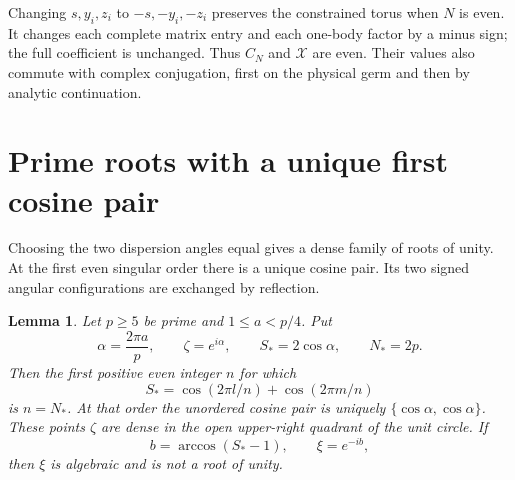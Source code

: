 \documentclass[11pt]{article}
\numberwithin{equation}{section}
\newtheorem{lemma}[theorem]{Lemma}
\theoremstyle{remark}\newtheorem{remark}[theorem]{Remark}
\newcommand{\X}{\mathcal X}
\begin{document}
Changing $s,y_i,z_i$ to $-s,-y_i,-z_i$ preserves the constrained
torus when $N$ is even. It changes each complete matrix entry and
each one-body factor by a minus sign; the full coefficient is
unchanged. Thus $C_N$ and $\X$ are even. Their values also commute
with complex conjugation, first on the physical germ and then by
analytic continuation.

\section{Prime roots with a unique first cosine pair}
\label{sec:prime-roots}

Choosing the two dispersion angles equal gives a dense family of roots
of unity. At the first even singular order there is a unique cosine
pair. Its two signed angular configurations are exchanged by reflection.

\begin{lemma}\label{lem:prime-root-family}
Let $p\geq5$ be prime and $1\leq a<p/4$. Put
\[
 \alpha=\frac{2\pi a}{p},\qquad
 \zeta=e^{i\alpha},\qquad S_*=2\cos\alpha,
 \qquad N_*=2p.
\]
Then the first positive even integer $n$ for which
\[
 S_*=\cos(2\pi l/n)+\cos(2\pi m/n)
\]
is $n=N_*$. At that order the unordered cosine pair is uniquely
$\{\cos\alpha,\cos\alpha\}$. These points $\zeta$ are dense in the open
upper-right quadrant of the unit circle. If
\[
 b=\arccos(S_*-1),\qquad \xi=e^{-ib},
\]
then $\xi$ is algebraic and is not a root of unity.
\end{lemma}
\end{document}

